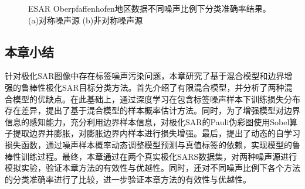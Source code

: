\begin{figure}[ht!]
    \caption{ESAR Oberpfaffenhofen地区数据不同噪声比例下分类准确率结果。(a)对称噪声源 (b)非对称噪声源}
    \label{fig:ober_noise}
\end{figure}

\subsection{本章小结}
针对极化SAR图像中存在标签噪声污染问题，本章研究了基于混合模型和边界增强的鲁棒性极化SAR目标分类方法。首先介绍了有限混合模型，并分析了两种混合模型的优缺点。在此基础上，通过深度学习在包含标签噪声样本下训练损失分布存在差异，提出了基于混合模型的样本概率估计方法。同时，为了增强模型对边界信息的感知能力，充分利用边界样本信息，对极化SAR的Pauli伪彩图使用Sobel算子提取边界并膨胀，对膨胀边界内样本进行损失增强。最后，提出了动态的自学习损失函数，通过噪声样本概率动态调整模型预测与真值标签的依赖，实现模型的鲁棒性训练过程。最终，本章通过在两个真实极化SARS数据集，对两种噪声源进行模拟实验，验证本章方法的有效性与优越性。同时，还对不同噪声比例下各个方法的分类准确率进行了比较，进一步验证本章方法的有效性与优越性。